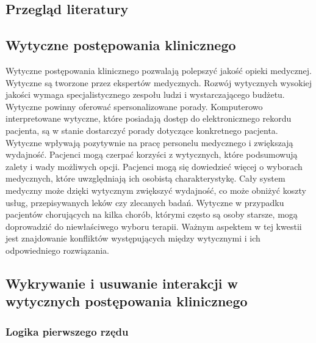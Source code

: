 \documentclass[oneside,a4paper]{book}
\begin{document}
\begin{spacing}{1.5}
\chapter{Przegląd literatury}
\section{Wytyczne postępowania klinicznego}

Wytyczne postępowania klinicznego\cite{Boyd, Latoszek-Berendsen} pozwalają polepszyć jakość opieki medycznej. Wytyczne są tworzone przez ekspertów medycznych. Rozwój wytycznych wysokiej jakości wymaga specjalistycznego zespołu ludzi i wystarczającego budżetu. Wytyczne powinny oferować spersonalizowane porady. Komputerowo interpretowane wytyczne, które posiadają dostęp do elektronicznego rekordu pacjenta, są w stanie dostarczyć porady dotyczące konkretnego pacjenta. Wytyczne wpływają pozytywnie na pracę personelu medycznego i zwiększają wydajność. Pacjenci mogą czerpać korzyści z wytycznych, które podsumowują zalety i wady możliwych opcji. Pacjenci mogą się dowiedzieć więcej o wyborach medycznych, które uwzględniają ich osobistą charakterystykę. Cały system medyczny może dzięki wytycznym zwiększyć wydajność, co może obniżyć koszty usług, przepisywanych leków czy zlecanych badań. Wytyczne w przypadku pacjentów chorujących na kilka chorób, którymi często są osoby starsze, mogą doprowadzić do niewłaściwego wyboru terapii. Ważnym aspektem w tej kwestii jest znajdowanie konfliktów występujących między wytycznymi i ich odpowiedniego rozwiązania.

\section{Wykrywanie i usuwanie interakcji w wytycznych postępowania klinicznego}

\subsection{Logika pierwszego rzędu}


\end{spacing}
\end{document}

